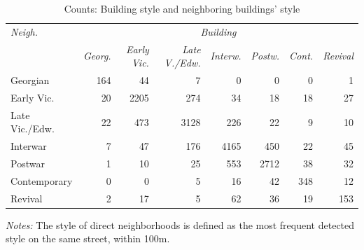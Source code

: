 \documentclass[]{article}
\begin{document}
\newpage

\begin{table}[ht]
\caption{Counts: Building style and neighboring buildings' style}
\label{tab:vintneigh}
\centering
\begin{tabular}{lrrrrrrr}
\toprule
\emph{Neigh.} & \multicolumn{7}{c}{\emph{Building}} \\
 \cmidrule(lr){1-1}
 \cmidrule(lr){2-8}
& \emph{Georg.} & \emph{Early Vic.} & \emph{Late V./Edw.} & \emph{Interw.} & \emph{Postw.} & \emph{Cont.} & \emph{Revival} \\ 
  \cmidrule(lr){2-8}
Georgian & 164 &  44 &   7 &   0 &   0 &   0 &   1 \\ 
  Early Vic. &  20 & 2205 & 274 &  34 &  18 &  18 &  27 \\ 
  Late Vic./Edw. &  22 & 473 & 3128 & 226 &  22 &   9 &  10 \\ 
  Interwar &   7 &  47 & 176 & 4165 & 450 &  22 &  45 \\ 
  Postwar &   1 &  10 &  25 & 553 & 2712 &  38 &  32 \\ 
  Contemporary &   0 &   0 &   5 &  16 &  42 & 348 &  12 \\ 
  Revival &   2 &  17 &   5 &  62 &  36 &  19 & 153 \\ 
   \bottomrule
\end{tabular}
\begin{minipage}{\textwidth}
\vspace{0.25cm}
\footnotesize \emph{Notes:} The style of direct neighborhoods is defined as the most frequent detected style on the same street, within 100m. 
\end{minipage}
\end{table}

\newpage
\end{document}
